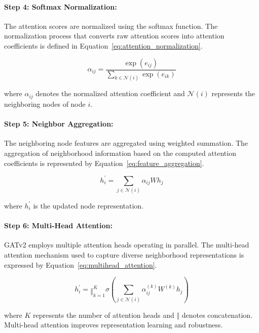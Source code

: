 \paragraph{Step 4: Softmax Normalization:}

The attention scores are normalized using the softmax function. The normalization process that converts raw attention scores into attention coefficients is defined in Equation~\eqref{eq:attention_normalization}.

\begin{equation}
\alpha_{ij} = \frac{\exp(e_{ij})}{\sum_{k \in \mathcal{N}(i)} \exp(e_{ik})}
\label{eq:attention_normalization}
\end{equation}

where \(\alpha_{ij}\) denotes the normalized attention coefficient and \(\mathcal{N}(i)\) represents the neighboring nodes of node \(i\).

\paragraph{Step 5: Neighbor Aggregation:}

The neighboring node features are aggregated using weighted summation. The aggregation of neighborhood information based on the computed attention coefficients is represented by Equation~\eqref{eq:feature_aggregation}.

\begin{equation}
h_i^{\prime} = \sum_{j \in \mathcal{N}(i)} \alpha_{ij}Wh_j
\label{eq:feature_aggregation}
\end{equation}

where \(h_i^{\prime}\) is the updated node representation.

\paragraph{Step 6: Multi-Head Attention:}

GATv2 employs multiple attention heads operating in parallel. The multi-head attention mechanism used to capture diverse neighborhood representations is expressed by Equation~\eqref{eq:multihead_attention}.

\begin{equation}
h_i^{\prime} =
\mathop{\Vert}_{k=1}^{K}
\sigma
\left(
\sum_{j \in \mathcal{N}(i)}
\alpha_{ij}^{(k)}W^{(k)}h_j
\right)
\label{eq:multihead_attention}
\end{equation}

where \(K\) represents the number of attention heads and \(\Vert\) denotes concatenation. Multi-head attention improves representation learning and robustness.

